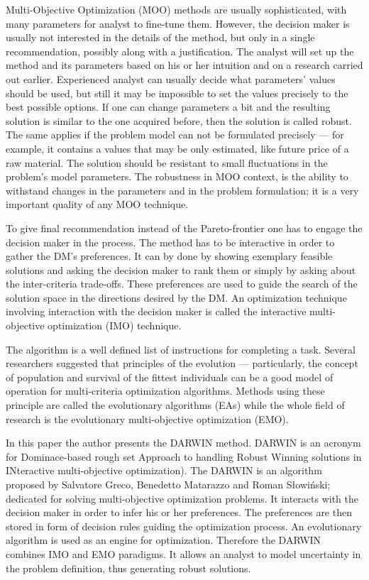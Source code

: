 Multi-Objective Optimization (MOO) methods are usually sophisticated, with
many parameters for analyst to fine-tune them. However, the decision maker is
usually not interested in the details of the method, but only in a single
recommendation, possibly along with a justification. The analyst will set up
the method and its parameters based on his or her intuition and on a research
carried out earlier. Experienced analyst can usually decide what parameters'
values should be used, but still it may be impossible to set the values
precisely to the best possible options. If one can change parameters a bit and
the resulting solution is similar to the one acquired before, then the
solution is called robust. The same applies if the problem model can not be
formulated precisely --- for example, it contains a values that may be only
estimated, like future price of a raw material. The solution should be
resistant to small fluctuations in the problem's model parameters. The
robustness in MOO context, is the ability to withstand changes in the
parameters and in the problem formulation; it is a very important quality of
any MOO technique.

To give final recommendation instead of the Pareto-frontier one has to engage
the decision maker in the process. The method has to be interactive in order
to gather the DM's preferences. It can by done by showing exemplary feasible
solutions and asking the decision maker to rank them or simply by asking about
the inter-criteria trade-offs. These preferences are used to guide the search
of the solution space in the directions desired by the DM. An optimization
technique involving interaction with the decision maker is called the
interactive multi-objective optimization (IMO) technique.

The algorithm is a well defined list of instructions for completing a
task. Several researchers suggested that principles of the evolution ---
particularly, the concept of population and survival of the fittest
individuals can be a good model of operation for multi-criteria optimization
algorithms. Methods using these principle are called the evolutionary
algorithms (EAs) while the whole field of research is the evolutionary
multi-objective optimization (EMO).

In this paper the author presents the DARWIN method. DARWIN is an acronym for
Dominace-based rough set Approach to handling Robust Winning solutions in
INteractive multi-objective optimization). The DARWIN is an algorithm proposed
by Salvatore Greco, Benedetto Matarazzo and Roman Słowiński; dedicated for
solving multi-objective optimization problems. It interacts with the decision
maker in order to infer his or her preferences. The preferences are then
stored in form of decision rules guiding the optimization process. An
evolutionary algorithm is used as an engine for optimization. Therefore the
DARWIN combines IMO and EMO paradigms. It allows an analyst to model
uncertainty in the problem definition, thus generating robust solutions.

